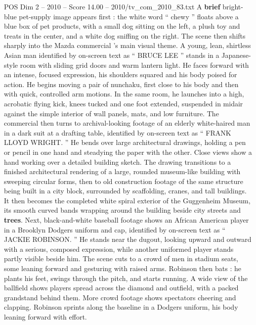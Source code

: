 \begin{textsample}{POS Dim 2 – 2010 – Score 14.00 – 2010/tv\_com\_2010\_83.txt}  \label{ex:f2_pos_059}
A \textbf{brief} bright-blue pet-supply image appears first : the white word “ chewy ” floats above a blue box of pet products, with a small dog sitting on the left, a plush toy and treats in the center, and a white dog sniffing on the right.
The scene then shifts sharply into the Mazda commercial ’s main visual theme.
A young, lean, shirtless Asian man identified by on-screen text as “ BRUCE LEE ” stands in a Japanese-style room with sliding grid doors and warm lantern light.
He faces forward with an intense, focused expression, his shoulders squared and his body poised for action.
He begins moving a pair of nunchaku, first close to his body and then with quick, controlled arm motions.
In the same room, he launches into a high, acrobatic flying kick, knees tucked and one foot extended, suspended in midair against the simple interior of wall panels, mats, and low furniture.
The commercial then turns to archival-looking footage of an elderly white-haired man in a dark suit at a drafting table, identified by on-screen text as “ FRANK LLOYD WRIGHT. ” He bends over large architectural drawings, holding a pen or pencil in one hand and steadying the paper with the other.
Close views show a hand working over a detailed building sketch.
The drawing transitions to a finished architectural rendering of a large, rounded museum-like building with sweeping circular forms, then to old construction footage of the same structure being built in a city block, surrounded by scaffolding, cranes, and tall buildings.
It then becomes the completed white spiral exterior of the Guggenheim Museum, its smooth curved bands wrapping around the building beside city streets and \textbf{trees}.
Next, black-and-white baseball footage shows an African American player in a Brooklyn Dodgers uniform and cap, identified by on-screen text as “ JACKIE ROBINSON. ” He stands near the dugout, looking upward and outward with a serious, composed expression, while another uniformed player stands partly visible beside him.
The scene cuts to a crowd of men in stadium seats, some leaning forward and gesturing with raised arms.
Robinson then bats : he plants his feet, swings through the pitch, and starts running.
A wide view of the ballfield shows players spread across the diamond and outfield, with a packed grandstand behind them.
More crowd footage shows spectators cheering and clapping.
Robinson sprints along the baseline in a Dodgers uniform, his body leaning forward with effort.

\end{textsample}
